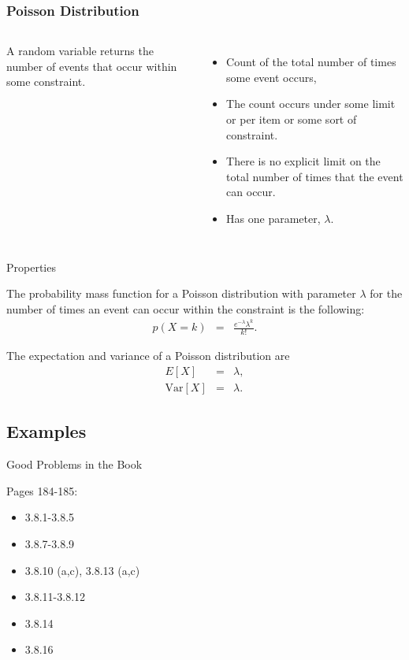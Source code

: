 \begin{frame}
  \frametitle{Poisson Distribution}

  \begin{columns}
    \begin{definition}
      A  random variable returns the number of events
      that occur within some constraint.
    \end{definition}
      \begin{itemize}
      \item Count of the total number of times some event occurs,
      \item The count occurs under some limit or per item or some sort
        of constraint.
      \item There is no explicit limit on the total number of times
        that the event can occur.
      \item Has one parameter, $\lambda$.
      \end{itemize}
  \end{columns}

\end{frame}

\begin{frame}{Properties}

  The probability mass function for a Poisson distribution with
  parameter $\lambda$ for the number of times an event can occur
  within the constraint is the following:
  \begin{eqnarray*}
    p(X=k) & = & \frac{e^{-\lambda}\lambda^k}{k!}.
  \end{eqnarray*}

  The expectation and variance of a Poisson distribution are
  \begin{eqnarray*}
    E[X] & = & \lambda, \\
    \mathrm{Var}[X] & = & \lambda.
  \end{eqnarray*}

\end{frame}


\subsection{Examples}

\begin{frame}{Good Problems in the Book}

  \vfill 
  Pages 184-185:
  \begin{itemize}
  \item 3.8.1-3.8.5
  \item 3.8.7-3.8.9
  \item 3.8.10 (a,c), 3.8.13 (a,c)
  \item 3.8.11-3.8.12
  \item 3.8.14
  \item 3.8.16
  \end{itemize}
  \vfill
  
\end{frame}


